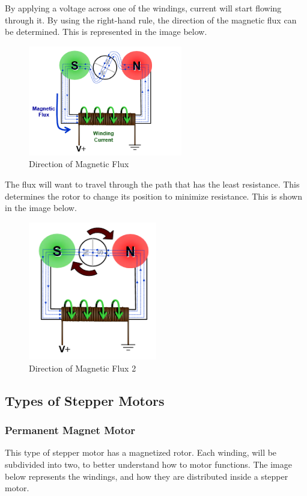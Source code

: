 By applying a voltage across one of the windings, current will start flowing through it. By using the right-hand rule, the direction of the magnetic flux can be determined. This is represented in the image below.

\begin{figure}[h]
	\centering
	\includegraphics[width=0.6\textwidth]{figures/motor3.png}
	\caption{Direction of Magnetic Flux}
\end{figure}

The flux will want to travel through the path that has the least resistance. This determines the rotor to change its position to minimize resistance. This is shown in the image below.

\begin{figure}[h]
	\centering
	\includegraphics[width=0.5\textwidth]{figures/motor4.png}
	\caption{Direction of Magnetic Flux 2}
\end{figure}
\subsection{Types of Stepper Motors}
\subsubsection{Permanent Magnet Motor}
This type of stepper motor has a magnetized rotor. Each winding, will be subdivided into two, to better understand how to motor functions. The image below represents the windings, and how they are distributed inside a stepper motor.

